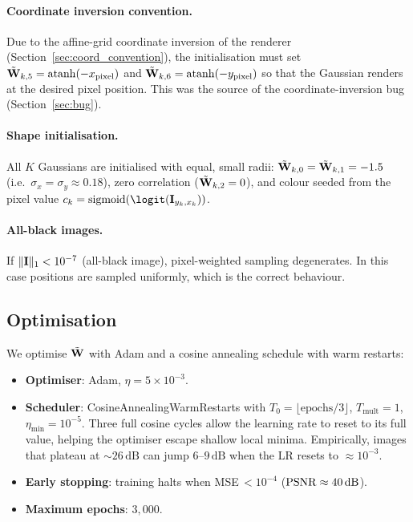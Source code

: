 \paragraph{Coordinate inversion convention.}
Due to the affine-grid coordinate inversion of the renderer
(Section~\ref{sec:coord_convention}), the initialisation must set
$\tilde{\mathbf{W}}_{k,5} = \operatorname{atanh}(-x_\text{pixel})$ and
$\tilde{\mathbf{W}}_{k,6} = \operatorname{atanh}(-y_\text{pixel})$
so that the Gaussian renders at the desired pixel position.
This was the source of the coordinate-inversion bug (Section~\ref{sec:bug}).

\paragraph{Shape initialisation.}
All $K$ Gaussians are initialised with equal, small radii:
$\tilde{\mathbf{W}}_{k,0} = \tilde{\mathbf{W}}_{k,1} = -1.5$ (i.e.\ $\sigma_x = \sigma_y \approx 0.18$),
zero correlation ($\tilde{\mathbf{W}}_{k,2} = 0$), and colour seeded from the pixel value
$c_k = \sigmoid(\logit(\I_{y_k, x_k}))$.

\paragraph{All-black images.}
If $\|\mathbf{I}\|_1 < 10^{-7}$ (all-black image), pixel-weighted sampling degenerates.
In this case positions are sampled uniformly, which is the correct behaviour.

\subsection{Optimisation}
\label{sec:optimisation}

We optimise $\tilde{\mathbf{W}}$ with Adam and a cosine annealing schedule with warm restarts:

\begin{itemize}[leftmargin=2em]
  \item \textbf{Optimiser}: Adam, $\eta = 5 \times 10^{-3}$.
  \item \textbf{Scheduler}: CosineAnnealingWarmRestarts with $T_0 = \lfloor
        \text{epochs}/3 \rfloor$, $T_\text{mult} = 1$, $\eta_\text{min} = 10^{-5}$.
        Three full cosine cycles allow the learning rate to reset to its full value,
        helping the optimiser escape shallow local minima.
        Empirically, images that plateau at ${\sim}26\,\text{dB}$ can jump $6\text{--}9\,\text{dB}$
        when the LR resets to ${\approx}10^{-3}$.
  \item \textbf{Early stopping}: training halts when MSE\,$<10^{-4}$
        ($\mathrm{PSNR} \approx 40\,\text{dB}$).
  \item \textbf{Maximum epochs}: $3{,}000$.
\end{itemize}

